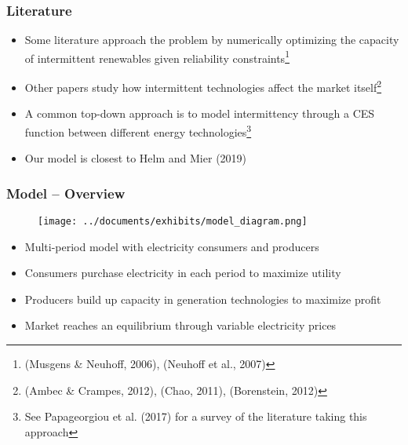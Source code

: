 \documentclass[aspectratio=169]{beamer}
\begin{document}
\begin{frame}
\frametitle{Literature}

\begin{itemize}
	\setlength\itemsep{0.2em}
	\item Some literature approach the problem by numerically optimizing the capacity of intermittent renewables given reliability constraints\footnote{(Musgens \& Neuhoff, 2006), (Neuhoff et al., 2007)}
	\item Other papers study how intermittent technologies affect the market itself\footnote{(Ambec \& Crampes, 2012), (Chao, 2011), (Borenstein, 2012)}	
	\item A common top-down approach is to model intermittency through a CES function between different energy technologies\footnote{See Papageorgiou et al. (2017) for a survey of the literature taking this approach}
	\item Our model is closest to Helm and Mier (2019)
\end{itemize}

\end{frame}


\begin{frame}
\frametitle{Model -- Overview}


\begin{figure}
	\texttt{[image: ../documents/exhibits/model\_diagram.png]} 
\end{figure}

\vspace{-1em}

\begin{itemize}
	\setlength\itemsep{0.2em}
	\item Multi-period model with electricity consumers and producers
	\item Consumers purchase electricity in each period to maximize utility
	\item Producers build up capacity in generation technologies to maximize profit
	\item Market reaches an equilibrium through variable electricity prices
\end{itemize}

\end{frame}
\end{document}
